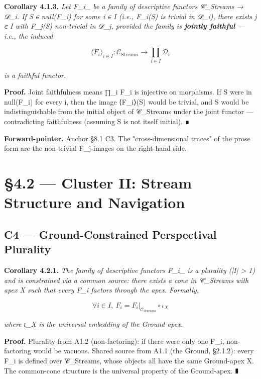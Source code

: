 \documentclass[11pt, openany]{book}
\newcommand{\sectionbreak}{\clearpage}
\begin{document}
\textbf{Corollary 4.1.3.} \textit{Let {F\_\allowbreak{}i}\_ be a family of descriptive functors 𝒞\_\allowbreak{}Streams → 𝒟\_\allowbreak{}i. If S ∈ null(F\_\allowbreak{}i) for some i ∈ I (i.e., F\_\allowbreak{}i(S) is trivial in 𝒟\_\allowbreak{}i), there exists j ∈ I with F\_\allowbreak{}j(S) non-trivial in 𝒟\_\allowbreak{}j, provided the family is \textbf{jointly faithful} --- i.e., the induced}

\[
\langle F_i \rangle_{i \in I} : \mathcal{C}_\mathrm{Streams} \to \prod_{i \in I} \mathcal{D}_i
\]

\textit{is a faithful functor.}

\textbf{Proof.} Joint faithfulness means ∏\_\allowbreak{}i F\_\allowbreak{}i is injective on morphisms. If S were in null(F\_\allowbreak{}i) for every i, then the image ⟨F\_\allowbreak{}i⟩(S) would be trivial, and S would be indistinguishable from the initial object of 𝒞\_\allowbreak{}Streams under the joint functor --- contradicting faithfulness (assuming S is not itself initial). ∎

\textbf{Forward-pointer.} Anchor §8.1 C3. The "cross-dimensional traces" of the prose form are the non-trivial F\_\allowbreak{}j-images on the right-hand side.

\sectionbreak

\section{§4.2 --- Cluster II: Stream Structure and Navigation}

\subsection{C4 --- Ground-Constrained Perspectival Plurality}

\textbf{Corollary 4.2.1.} \textit{The family of descriptive functors {F\_\allowbreak{}i}\_ is a plurality (|I| > 1) and is constrained via a common source: there exists a cone in 𝒞\_\allowbreak{}Streams with apex X such that every F\_\allowbreak{}i factors through the apex. Formally,}

\[
\forall i \in I,\ F_i = F_i|_{\mathcal{C}_\mathrm{Streams}} \circ \iota_X
\]

\textit{where ι\_\allowbreak{}X is the universal embedding of the Ground-apex.}

\textbf{Proof.} Plurality from A1.2 (non-factoring): if there were only one F\_\allowbreak{}i, non-factoring would be vacuous. Shared source from A1.1 (the Ground, §2.1.2): every F\_\allowbreak{}i is defined over 𝒞\_\allowbreak{}Streams, whose objects all have the same Ground-apex X. The common-cone structure is the universal property of the Ground-apex. ∎
\end{document}

